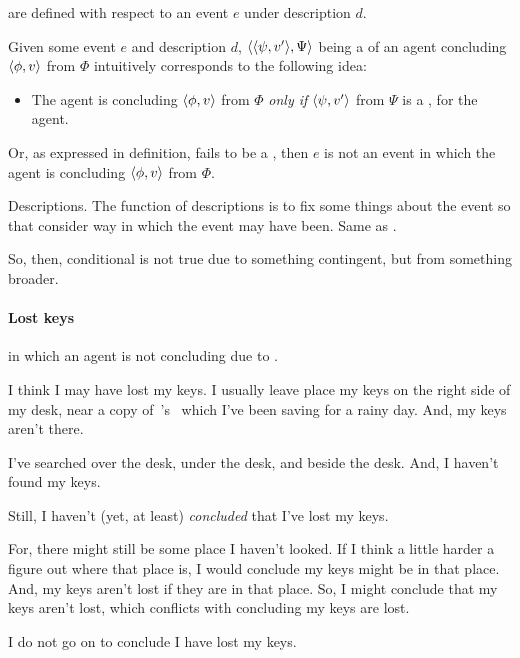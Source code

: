 \begin{note}
   are defined with respect to an event \(e\) under description \(d\).

  Given some event \(e\) and description \(d\), \(\langle \langle \psi, v' \rangle, \Psi \rangle\) being a \requ{} of an agent concluding \(\langle \phi, v \rangle\) from \(\Phi\) intuitively corresponds to the following idea:
  \begin{itemize}
  \item
    The agent is concluding \(\langle \phi, v \rangle\) from \(\Phi\) \emph{only if} \(\langle \psi, v' \rangle\) from \(\Psi\) is a \fc{}, for the agent.
  \end{itemize}

  Or, as expressed in definition, fails to be a \fc{}, then \(e\) is not an event in which the agent is concluding \(\langle \phi, v \rangle\) from \(\Phi\).

  Descriptions.
  The function of descriptions is to fix some things about the event so that consider way in which the event may have been.
  Same as \qWhyV{}.

  So, then, conditional is not true due to something contingent, but from something broader.
\end{note}

\paragraph*{Lost keys}

\begin{note}
   in which an agent is not concluding due to \requ{}.
\end{note}

\begin{note}
  \begin{illustration}%
    \label{illu:lost-key}%
    I think I may have lost my keys.
    I usually leave place my keys on the right side of my desk, near a copy of~\citeauthor{Vickers:1989tr}'s~ which I've been saving for a rainy day.
    And, my keys aren't there.

    I've searched over the desk, under the desk, and beside the desk.
    And, I haven't found my keys.

    Still, I haven't (yet, at least) \emph{concluded} that I've lost my keys.

    For, there might still be some place I haven't looked.
    If I think a little harder a figure out where that place is, I would conclude my keys might be in that place.
    And, my keys aren't lost if they are in that place.
    So, I might conclude that my keys aren't lost, which conflicts with concluding my keys are lost.

    I do not go on to conclude I have lost my keys.
  \end{illustration}
\end{note}

